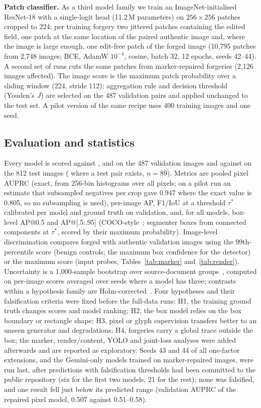 \textbf{Patch classifier.} As a third model family we train an ImageNet-initialised ResNet-18 with a single-logit head (11.2\,M parameters) on $256{\times}256$ patches cropped to 224: per training forgery two jittered patches containing the edited field, one patch at the same location of the paired authentic image and, where the image is large enough, one edit-free patch of the forged image (10{,}795 patches from 2{,}748 images; BCE, AdamW $10^{-4}$, cosine, batch 32, 12 epochs, seeds 42--44). A second set of runs cuts the same patches from marker-repaired forgeries (2{,}126 images affected). The image score is the maximum patch probability over a sliding window (224, stride 112); aggregation rule and decision threshold (Youden's $J$) are selected on the 487 validation pairs and applied unchanged to the test set. A pilot version of the same recipe uses 400 training images and one seed.

\subsection{Evaluation and statistics}
Every model is scored against \GTb, \GTp{} and \GTg{} on the 487 validation images and against \GTb{} on the 812 test images (\GTp{} where a test pair exists, $n{=}89$). Metrics are pooled pixel AUPRC (exact, from 256-bin histograms over all pixels; on a pilot run an estimate that subsampled negatives per crop gave 0.947 where the exact value is 0.805, so no subsampling is used), per-image AP, F1/IoU at a threshold $\tau^*$ calibrated per model and ground truth on validation, and, for all models, box-level AP@0.5 and AP@[.5:.95] (COCO-style~\cite{lin2014coco}; segmenter boxes from connected components at $\tau^*$, scored by their maximum probability). Image-level discrimination compares forged with authentic validation images using the 99th-percentile score (benign controls; the maximum box confidence for the detector) or the maximum score (input probes, Tables~\ref{tab:marker} and~\ref{tab:render}). Uncertainty is a 1{,}000-sample bootstrap over source-document groups~\cite{efron1979bootstrap}, computed on per-image scores averaged over seeds where a model has three; contrasts within a hypothesis family are Holm-corrected~\cite{holm1979}. Four hypotheses and their falsification criteria were fixed before the full-data runs: H1, the training ground truth changes scores and model ranking; H2, the box model relies on the box boundary or rectangle shape; H3, pixel or glyph supervision transfers better to an unseen generator and degradations; H4, forgeries carry a global trace outside the box; the marker, render/content, YOLO and joint-loss analyses were added afterwards and are reported as exploratory. Seeds 43 and 44 of all one-factor extensions, and the Gemini-only models trained on marker-repaired images, were run last, after predictions with falsification thresholds had been committed to the public repository (six for the first two models, 21 for the rest); none was falsified, and one result fell just below its predicted range (validation \GTp{} AUPRC of the repaired pixel model, 0.507 against 0.51--0.58).
